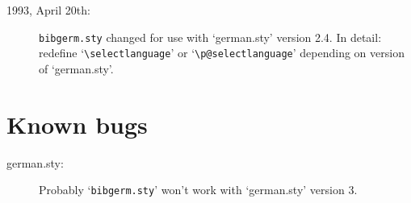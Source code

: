 \begin{description}
\item[1993, April 20th:] \verb|bibgerm.sty| changed for use with `german.sty' 
version 2.4. In detail: redefine `\verb|\selectlanguage|' or 
`\verb|\p@selectlanguage|' depending on version of `german.sty'. 
\end{description}

\section{Known bugs}

\begin{description}
\item[german.sty:] Probably `\verb|bibgerm.sty|' won't work with `german.sty' 
version 3.
\end{description}





